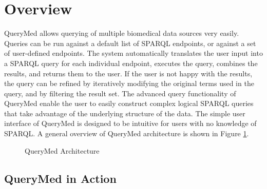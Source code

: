 \documentclass{acm_proc_article-sp}
\begin{document}
\section{Overview}

QueryMed allows querying of multiple biomedical data sources very easily.  Queries can be run against a default list of SPARQL endpoints, or against a set of user-defined endpoints. The system automatically translates the user input into a SPARQL query for each individual endpoint, executes the query, combines the results, and returns them to the user.  If the user is not happy with the results, the query can be refined  by iteratively modifying the original terms used in the query, and by filtering the result set.  The advanced query functionality of QueryMed enable the user to easily construct complex logical SPARQL queries that take advantage of the underlying structure of the data. The simple user interface of QueryMed is designed to be intuitive for users with no knowledge of SPARQL. A general overview of QueryMed architecture is shown in Figure \ref{fig:arch_details}.

\begin{figure}
\centering
{}
\caption{QueryMed Architecture}
\label{fig:arch_details}
\end{figure}

\subsection{QueryMed in Action}
\end{document}

